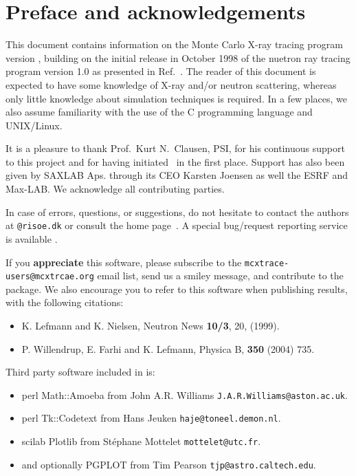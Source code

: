 
\chapter*{Preface and acknowledgements}
This document contains information on the Monte Carlo
X-ray tracing program \MCX version \version, building on the initial
release in October 1998 of the nuetron ray tracing program \MCS version 1.0 as presented in Ref.~\cite{nn_10_20}. The reader of this
document is expected to have some knowledge of X-ray and/or neutron scattering,
whereas only little knowledge about simulation techniques is
required. In a few places, we also assume familiarity with the
use of the C programming language and UNIX/Linux.

It is a pleasure to thank Prof.~Kurt N.~Clausen, PSI, for his continuous
support to this project and for having initiated \MCS\ in the first
place. 
Support has also been given by SAXLAB Aps. through its CEO Karsten Joensen as well 
the ESRF and Max-LAB. We acknowledge all contributing parties. 


In case of errors, questions, or suggestions,
do not hesitate to
contact the authors at \verb+@risoe.dk+
or consult the \MCX home page~\cite{mcxtrace_webpage}.
A special bug/request reporting service is available \cite{mczilla_webpage}.

If you {\bf appreciate} this software, please subscribe to the \verb+mcxtrace-users@mcxtrcae.org+ email list, send us a smiley message, and contribute to the package. We also encourage you to refer to this software when publishing results, with the following citations:
\begin{itemize}
\item{K. Lefmann and K. Nielsen, Neutron News {\bf 10/3}, 20, (1999).}
\item{P. Willendrup, E. Farhi and K. Lefmann, Physica B, {\bf 350} (2004) 735.}
\end{itemize}



Third party software included in \MCX is:
\begin{itemize}
\item perl Math::Amoeba from John A.R. Williams \verb+J.A.R.Williams@aston.ac.uk+.
\item perl Tk::Codetext from Hans Jeuken \verb+haje@toneel.demon.nl+.
\item scilab Plotlib from St\'ephane Mottelet \verb+mottelet@utc.fr+.
\item and optionally PGPLOT from Tim Pearson \verb+tjp@astro.caltech.edu+.
\end{itemize}

